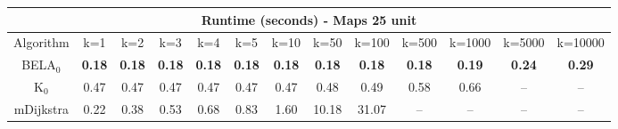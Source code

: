 \begin{tabular}{c|cccccccccccc}\toprule
\multicolumn{13}{c}{Runtime (seconds) - Maps 25 unit}\\ \midrule
Algorithm & k=1 & k=2 & k=3 & k=4 & k=5 & k=10 & k=50 & k=100 & k=500 & k=1000 & k=5000 & k=10000 \\ \midrule
BELA$_0$ & \textbf{0.18} & \textbf{0.18} & \textbf{0.18} & \textbf{0.18} & \textbf{0.18} & \textbf{0.18} & \textbf{0.18} & \textbf{0.18} & \textbf{0.18} & \textbf{0.19} & \textbf{0.24} & \textbf{0.29} \\
K$_0$ & 0.47 & 0.47 & 0.47 & 0.47 & 0.47 & 0.47 & 0.48 & 0.49 & 0.58 & 0.66 & -- & -- \\
mDijkstra & 0.22 & 0.38 & 0.53 & 0.68 & 0.83 & 1.60 & 10.18 & 31.07 & -- & -- & -- & -- \\ \bottomrule 
\end{tabular}
